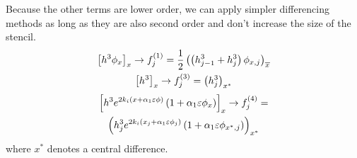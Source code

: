 \begin{frame} 
    Because the other terms are lower order, we can apply simpler differencing methods
    as long as they are also second order and don't increase the size of the stencil.
    \begin{gather*}  
        \left[ h^3\phi_x \right]_x \rightarrow f_j^{\left( 1 \right)} = \frac{1}{2}\left( \left( h_{j-1}^3 + h_j^3 \right) \phi_{x, j} \right)_{\overline{x}}\\
        \left[ h^3 \right]_x \rightarrow f_j^{\left( 3 \right)} = \left( h^3_j \right)_{x^*}\\
    \end{gather*}
    \vspace{-4em}
    \begin{multline*}
        \left[ h^3 e^{2k_i \left( x + \alpha_1 \varepsilon \phi \right)} \left( 1 + \alpha_1 \varepsilon \phi_x \right) \right]_x 
        \rightarrow f_j^{\left( 4 \right)} = \\ \left( h^3_j e^{2k_i \left( x_j + \alpha_1 \varepsilon \phi_j \right)} \left( 1 + \alpha_1 \varepsilon \phi_{x^*, j} \right) \right)_{x^*}
    \end{multline*}
    where $x^*$ denotes a central difference. 
\end{frame}